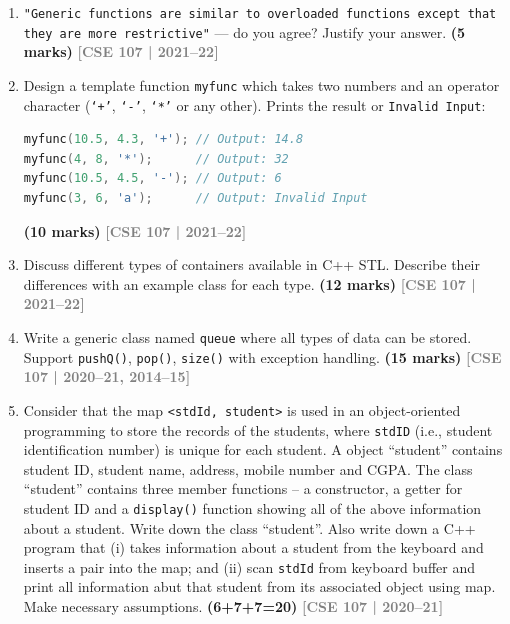 \documentclass[12pt,a3paper]{article}
\newcommand{\yr}[1]{\hfill\textcolor{gray}{\small\textbf{[#1]}}}
\newcommand{\mk}[1]{\textcolor{orange!70!black}{\small\textbf{(#1 marks)}}}
\begin{document}
\begin{enumerate}
\item \texttt{"Generic functions are similar to overloaded functions except that they are more restrictive"} --- do you agree? Justify your answer. \mk{5}
\yr{CSE 107 | 2021--22}




\item Design a template function \texttt{myfunc} which takes two numbers and an operator character (\texttt{`+'}, \texttt{`-'}, \texttt{`*'} or any other). Prints the result or \texttt{Invalid Input}:
\begin{lstlisting}[language=C++]
myfunc(10.5, 4.3, '+'); // Output: 14.8
myfunc(4, 8, '*');      // Output: 32
myfunc(10.5, 4.5, '-'); // Output: 6
myfunc(3, 6, 'a');      // Output: Invalid Input
\end{lstlisting}
\mk{10}
\yr{CSE 107 | 2021--22}




\item Discuss different types of containers available in C++ STL. Describe their differences with an example class for each type. \mk{12}
\yr{CSE 107 | 2021--22}




\item Write a generic class named \texttt{queue} where all types of data can be stored. Support \texttt{pushQ()}, \texttt{pop()}, \texttt{size()} with exception handling. \mk{15}
\yr{CSE 107 | 2020--21, 2014--15}




\item Consider that the map \texttt{<stdId, student>} is used in an object-oriented programming to store the records of the students, where \texttt{stdID} (i.e., student identification number) is unique for each student. A object ``student'' contains student ID, student name, address, mobile number and CGPA. The class ``student'' contains three member functions -- a constructor, a getter for student ID and a \texttt{display()} function showing all of the above information about a student. Write down the class ``student''. Also write down a C++ program that (i) takes information about a student from the keyboard and inserts a pair into the map; and (ii) scan \texttt{stdId} from keyboard buffer and print all information abut that student from its associated object using map. Make necessary assumptions. \hfill \textbf{(6+7+7=20)}
\yr{CSE 107 | 2020--21}


\end{enumerate}
\end{document}
